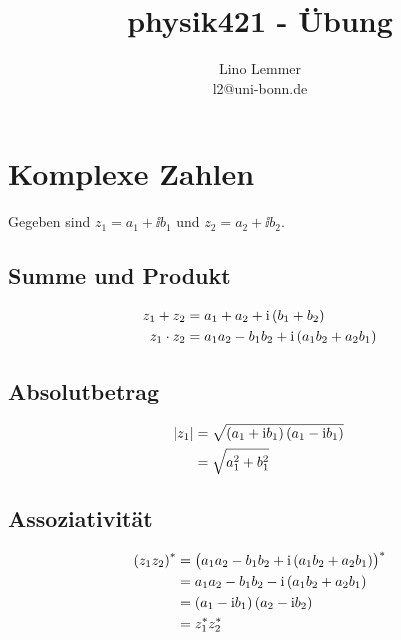 

\setcounter{thezettel}{1}
\renewcommand\thesection{\arabic{thezettel}.\arabic{section}}

\title{physik421 - Übung }
\author{Lino Lemmer \\ \small{l2@uni-bonn.de}}


\maketitle

\section{Komplexe Zahlen}

Gegeben sind $z_1 = a_1 + \ii b_1$ und $z_2 = a_2 + \ii b_2$.

\subsection{Summe und Produkt}

\begin{align*}
    z_1 + z_2 &= a_1 + a_2 + \ii\del{b_1 + b_2} \\
    z_1 \cdot z_2 &= a_1a_2 - b_1b_2 + \ii\del{a_1b_2+a_2b_1}
\end{align*}

\subsection{Absolutbetrag}

\begin{align*}
    \abs{z_1} &= \sqrt{\del{a_1 + \ii b_1}\del{a_1 - \ii b_1}} \\
              &= \sqrt{a_1^2 + b_1^2}
\end{align*}

\subsection{Assoziativität}

\begin{align*}
    \del{z_1z_2}^* &= \del{a_1a_2 - b_1b_2 + \ii\del{a_1b_2 + a_2b_1}}^* \\
                   &= a_1a_2 - b_1b_2 - \ii\del{a_1b_2 + a_2b_1} \\
                   &= \del{a_1 - \ii b_1}\del{a_2 - \ii b_2} \\
                   &= z_1^* z_2^*
\end{align*}


